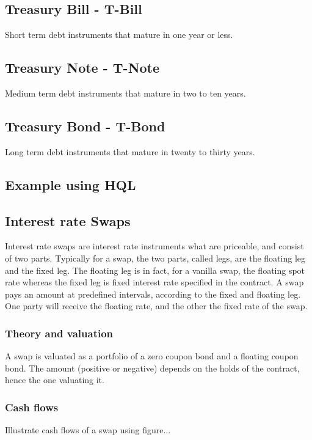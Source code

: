 \documentclass[11pt,a4paper]{article}
\numberwithin{equation}{section}
\begin{document}
	\subsection{Treasury Bill - T-Bill}
	Short term debt instruments that mature in one year or less.
	\subsection{Treasury Note - T-Note}
	Medium term debt instruments that mature in two to ten years.
	\subsection{Treasury Bond - T-Bond}
	Long term debt instruments that mature in twenty to thirty years.

	\subsection{Example using HQL}

	\subsection{Interest rate Swaps}
	Interest rate swaps are interest rate instruments what are priceable, and consist of two parts. Typically for a swap, the
	two parts, called legs, are the floating leg and the fixed leg. The floating leg is in fact, for a vanilla swap, the floating spot rate whereas the fixed leg is fixed interest rate specified in the contract. A swap pays an amount at predefined intervals, according to the fixed and floating leg. One party will receive the floating rate, and the other the fixed rate of the swap.

	\subsubsection{Theory and valuation}
	A swap is valuated as a portfolio of a zero coupon bond and a floating coupon bond. The amount (positive or negative) depends on the holds of the contract, hence the one valuating it. 

	\subsubsection{Cash flows}
	Illustrate cash flows of a swap using figure...

\end{document}
